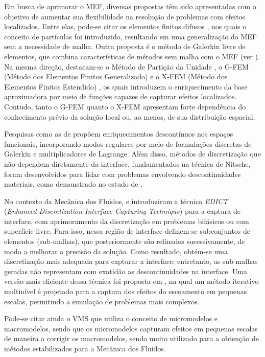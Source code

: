 Em busca de aprimorar o MEF, diversas propostas têm sido apresentadas com o objetivo de aumentar sua flexibilidade na resolução de problemas com efeitos localizados. Entre elas, pode-se citar os elementos finitos difusos \cite{NayrolesTV:1992}, nos quais o conceito de partículas foi introduzido, resultando em uma generalização do MEF sem a necessidade de malha. Outra proposta é o método de Galerkin livre de elementos, que combina características de métodos sem malha com o MEF (ver ). Na mesma direção, destacam-se o Método de Partição da Unidade \cite{MelenkB:1996}, o G-FEM (Método dos Elementos Finitos Generalizado) \cite{StrouboulisCB:2001} e o X-FEM (Método dos Elementos Finitos Estendido) \cite{Moes:2003}, os quais introduzem o enriquecimento da base aproximadora por meio de funções capazes de capturar efeitos localizados. Contudo, tanto o G-FEM quanto o X-FEM apresentam forte dependência do conhecimento prévio da solução local ou, ao menos, de sua distribuição espacial.

Pesquisas como as de  propõem enriquecimentos descontínuos nos espaços funcionais, incorporando modos regulares por meio de formulações discretas de Galerkin e multiplicadores de Lagrange. Além disso, métodos de discretização que não dependem diretamente da interface, fundamentados na técnica de Nitsche, foram desenvolvidos para lidar com problemas envolvendo descontinuidades materiais, como demonstrado no estudo de .

No contexto da Mecânica dos Fluidos,  e  introduziram a técnica \textit{EDICT} (\textit{Enhanced-Discretization Interface-Capturing Technique}) para a captura de interface, com aprimoramento da discretização em problemas bifásicos ou com superfície livre. Para isso, nessa região de interface definem-se subconjuntos de elementos (sub-malhas), que posteriormente são refinados sucessivamente, de modo a melhorar a precisão da solução. Como resultado, obtém-se uma discretização mais adequada para capturar a interface; entretanto, as sub-malhas geradas não representam com exatidão as descontinuidades na interface. Uma versão mais eficiente dessa técnica foi proposta em , na qual um método iterativo multinível é projetado para a captura dos efeitos do escoamento em pequenas escalas, permitindo a simulação de problemas mais complexos.

Pode-se citar ainda o VMS \cite{Hughesetal:1998} que utiliza o conceito de micromodelos e macromodelos, sendo que os micromodelos capturam efeitos em pequenas escalas de maneira a corrigir os macromodelos, sendo muito utilizado para a obtenção de métodos estabilizados para a Mecânica dos Fluidos.

